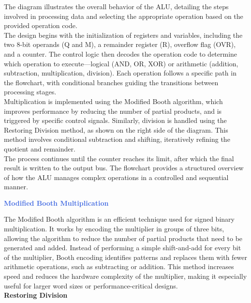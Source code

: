 \documentclass[12pt, letterpaper]{article}
\begin{document}
The diagram illustrates the overall behavior of the ALU, detailing the steps involved in processing data and selecting the appropriate operation based on the provided operation code.\\


The design begins with the initialization of registers and variables, including the two 8-bit operands (Q and M), a remainder register (R), overflow flag (OVR), and a counter.
The control logic then decodes the operation code to determine which operation to execute—logical (AND, OR, XOR) or arithmetic (addition, subtraction, multiplication, division).
Each operation follows a specific path in the flowchart, with conditional branches guiding the transitions between processing stages.\\


Multiplication is implemented using the Modified Booth algorithm, which improves performance by reducing the number of partial products, and is triggered by specific control signals. Similarly, division is handled using the
Restoring Division method, as shown on the right side of the diagram. This method involves conditional subtraction and shifting, iteratively refining the quotient and remainder.\\


The process continues until the counter reaches its limit, after which the final result is written to the output bus. The flowchart provides a structured overview of how the ALU manages complex operations in a controlled and
sequential manner.\\


\textcolor{RoyalBlue}{\textbf{Modified Booth Multiplication}}

The Modified Booth algorithm is an efficient technique used for signed binary multiplication. It works by encoding the multiplier in groups of three bits, allowing the algorithm to reduce the number of partial products that need to
be generated and added. Instead of performing a simple shift-and-add for every bit of the multiplier, Booth encoding identifies patterns and replaces them with fewer arithmetic operations, such as subtracting or addition. This
method increases speed and reduces the hardware complexity of the multiplier, making it especially useful for larger word sizes or performance-critical designs.\\

\textcolor{CarnationPink}{\textbf{Restoring Division}}
\end{document}
